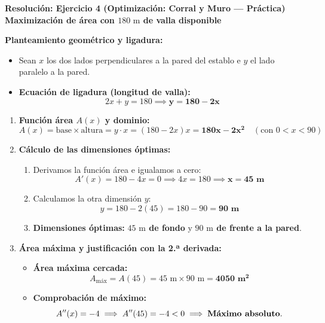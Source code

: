 ﻿\documentclass[11pt,a4paper]{article}
\begin{document}
\newpage

\begin{center}
    {\LARGE \textbf{Resolución: Ejercicio 4 (Optimización: Corral y Muro — Práctica)}}\\[4pt]
    {\large \textbf{Maximización de área con $180\text{ m}$ de valla disponible}}
\end{center}

\vspace{0.4cm}
\noindent\textbf{Planteamiento geométrico y ligadura:}
\begin{itemize}[leftmargin=1.5em, itemsep=3pt]
    \item Sean $x$ los dos lados perpendiculares a la pared del establo e $y$ el lado paralelo a la pared.
    \item \textbf{Ecuación de ligadura (longitud de valla):}
    \[
    2x + y = 180 \implies \mathbf{y = 180 - 2x}
    \]
\end{itemize}

\vspace{0.2cm}
\begin{enumerate}[label=\textbf{\alph*)}, leftmargin=2em, itemsep=8pt]
    \item \textbf{Función área $A(x)$ y dominio:}
    \[
    A(x) = \text{base} \times \text{altura} = y \cdot x = (180 - 2x)x = \mathbf{180x - 2x^2} \quad (\text{con } 0 < x < 90)
    \]

    \item \textbf{Cálculo de las dimensiones óptimas:}
    \begin{enumerate}[label=\arabic*., leftmargin=1.5em, itemsep=2pt]
        \item Derivamos la función área e igualamos a cero:
        \[
        A'(x) = 180 - 4x = 0 \implies 4x = 180 \implies \mathbf{x = 45\text{ m}}
        \]
        \item Calculamos la otra dimensión $y$:
        \[
        y = 180 - 2(45) = 180 - 90 = \mathbf{90\text{ m}}
        \]
        \item \textbf{Dimensiones óptimas:} \textbf{$45\text{ m}$ de fondo} y \textbf{$90\text{ m}$ de frente a la pared}.
    \end{enumerate}

    \item \textbf{Área máxima y justificación con la 2.ª derivada:}
    \begin{itemize}[leftmargin=1.5em, itemsep=2pt]
        \item \textbf{Área máxima cercada:}
        \[
        A_{\text{máx}} = A(45) = 45\text{ m} \times 90\text{ m} = \mathbf{4050\text{ m}^2}
        \]
        \item \textbf{Comprobación de máximo:}
        \[
        A''(x) = -4 \implies A''(45) = -4 < 0 \implies \text{\textbf{Máximo absoluto}}.
        \]
    \end{itemize}
\end{enumerate}
\end{document}
